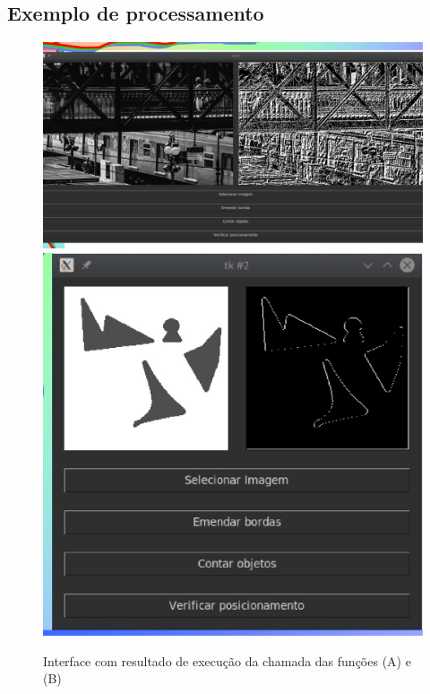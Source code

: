 \documentclass[a4paper,12pt]{article}
\begin{document}
\subsection{Exemplo de processamento}
\begin{figure}[h!]
  \includegraphics[scale=0.25]{cap_3.eps} \\
  \includegraphics[scale=0.5]{cap_4.eps}
  \caption{Interface com resultado de execução da chamada das funções (A) e (B)}
\end{figure}
\end{document}
